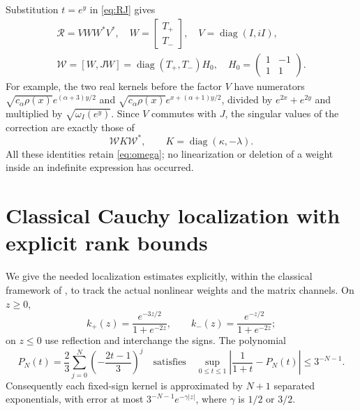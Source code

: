 \documentclass[11pt]{article}
\numberwithin{equation}{section}
\newcommand{\cW}{\mathcal W}
\newcommand{\diag}{\operatorname{diag}}
\begin{document}
Substitution $t=e^y$ in \eqref{eq:RJ} gives
\begin{align}\label{eq:exactfactor}
 \mathcal R=VWW^*V^*,\quad W=\begin{bmatrix}T_+\\T_-\end{bmatrix},
 \quad V=\diag(I,iI),\nonumber\\
 \cW=[W,JW]=\diag(T_+,T_-)H_0,
 \quad H_0=\begin{pmatrix}1&-1\\1&1\end{pmatrix}.
\end{align}
For example, the two real kernels before the factor $V$ have numerators
$\sqrt{c_\alpha\rho(x)}e^{(\alpha+3)y/2}$ and
$\sqrt{c_\alpha\rho(x)}e^{x+(\alpha+1)y/2}$, divided by
$e^{2x}+e^{2y}$ and multiplied by $\sqrt{\omega_I(e^y)}$.
Since $V$ commutes with $J$, the singular values of the correction are
exactly those of
\begin{equation}\label{eq:pencil}
 \cW K\cW^*,\qquad K=\diag(\kappa,-\lambda).
\end{equation}
All these identities retain \eqref{eq:omega}; no linearization or
deletion of a weight inside an indefinite expression has occurred.

\section{Classical Cauchy localization with explicit rank bounds}

We give the needed localization estimates explicitly, within the
classical framework of \cite{Laptev}, to track the actual nonlinear
weights and the matrix channels. On $z\ge0$,
\begin{equation}\label{eq:expkernel}
 k_+(z)=\frac{e^{-3z/2}}{1+e^{-2z}},\qquad
 k_-(z)=\frac{e^{-z/2}}{1+e^{-2z}};
\end{equation}
on $z\le0$ use reflection and interchange the signs. The polynomial
\begin{equation}\label{eq:Pn}
 P_N(t)=\frac23\sum_{j=0}^N\left(-\frac{2t-1}{3}\right)^j
 \quad\text{satisfies}\quad
 \sup_{0\le t\le1}\left|\frac1{1+t}-P_N(t)\right|\le3^{-N-1}.
\end{equation}
Consequently each fixed-sign kernel is approximated by $N+1$
separated exponentials, with error at most $3^{-N-1}e^{-\gamma|z|}$,
where $\gamma$ is $1/2$ or $3/2$.
\end{document}
